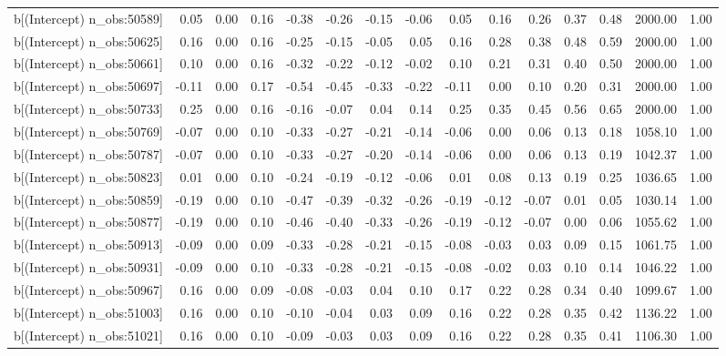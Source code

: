 \begin{table}[ht]
\begin{tabular}{rrrrrrrrrrrrrrr}
  b[(Intercept) n\_obs:50589] & 0.05 & 0.00 & 0.16 & -0.38 & -0.26 & -0.15 & -0.06 & 0.05 & 0.16 & 0.26 & 0.37 & 0.48 & 2000.00 & 1.00 \\ 
  b[(Intercept) n\_obs:50625] & 0.16 & 0.00 & 0.16 & -0.25 & -0.15 & -0.05 & 0.05 & 0.16 & 0.28 & 0.38 & 0.48 & 0.59 & 2000.00 & 1.00 \\ 
  b[(Intercept) n\_obs:50661] & 0.10 & 0.00 & 0.16 & -0.32 & -0.22 & -0.12 & -0.02 & 0.10 & 0.21 & 0.31 & 0.40 & 0.50 & 2000.00 & 1.00 \\ 
  b[(Intercept) n\_obs:50697] & -0.11 & 0.00 & 0.17 & -0.54 & -0.45 & -0.33 & -0.22 & -0.11 & 0.00 & 0.10 & 0.20 & 0.31 & 2000.00 & 1.00 \\ 
  b[(Intercept) n\_obs:50733] & 0.25 & 0.00 & 0.16 & -0.16 & -0.07 & 0.04 & 0.14 & 0.25 & 0.35 & 0.45 & 0.56 & 0.65 & 2000.00 & 1.00 \\ 
  b[(Intercept) n\_obs:50769] & -0.07 & 0.00 & 0.10 & -0.33 & -0.27 & -0.21 & -0.14 & -0.06 & 0.00 & 0.06 & 0.13 & 0.18 & 1058.10 & 1.00 \\ 
  b[(Intercept) n\_obs:50787] & -0.07 & 0.00 & 0.10 & -0.33 & -0.27 & -0.20 & -0.14 & -0.06 & 0.00 & 0.06 & 0.13 & 0.19 & 1042.37 & 1.00 \\ 
  b[(Intercept) n\_obs:50823] & 0.01 & 0.00 & 0.10 & -0.24 & -0.19 & -0.12 & -0.06 & 0.01 & 0.08 & 0.13 & 0.19 & 0.25 & 1036.65 & 1.00 \\ 
  b[(Intercept) n\_obs:50859] & -0.19 & 0.00 & 0.10 & -0.47 & -0.39 & -0.32 & -0.26 & -0.19 & -0.12 & -0.07 & 0.01 & 0.05 & 1030.14 & 1.00 \\ 
  b[(Intercept) n\_obs:50877] & -0.19 & 0.00 & 0.10 & -0.46 & -0.40 & -0.33 & -0.26 & -0.19 & -0.12 & -0.07 & 0.00 & 0.06 & 1055.62 & 1.00 \\ 
  b[(Intercept) n\_obs:50913] & -0.09 & 0.00 & 0.09 & -0.33 & -0.28 & -0.21 & -0.15 & -0.08 & -0.03 & 0.03 & 0.09 & 0.15 & 1061.75 & 1.00 \\ 
  b[(Intercept) n\_obs:50931] & -0.09 & 0.00 & 0.10 & -0.33 & -0.28 & -0.21 & -0.15 & -0.08 & -0.02 & 0.03 & 0.10 & 0.14 & 1046.22 & 1.00 \\ 
  b[(Intercept) n\_obs:50967] & 0.16 & 0.00 & 0.09 & -0.08 & -0.03 & 0.04 & 0.10 & 0.17 & 0.22 & 0.28 & 0.34 & 0.40 & 1099.67 & 1.00 \\ 
  b[(Intercept) n\_obs:51003] & 0.16 & 0.00 & 0.10 & -0.10 & -0.04 & 0.03 & 0.09 & 0.16 & 0.22 & 0.28 & 0.35 & 0.42 & 1136.22 & 1.00 \\ 
  b[(Intercept) n\_obs:51021] & 0.16 & 0.00 & 0.10 & -0.09 & -0.03 & 0.03 & 0.09 & 0.16 & 0.22 & 0.28 & 0.35 & 0.41 & 1106.30 & 1.00 \\ 

\end{tabular}
\end{table}
